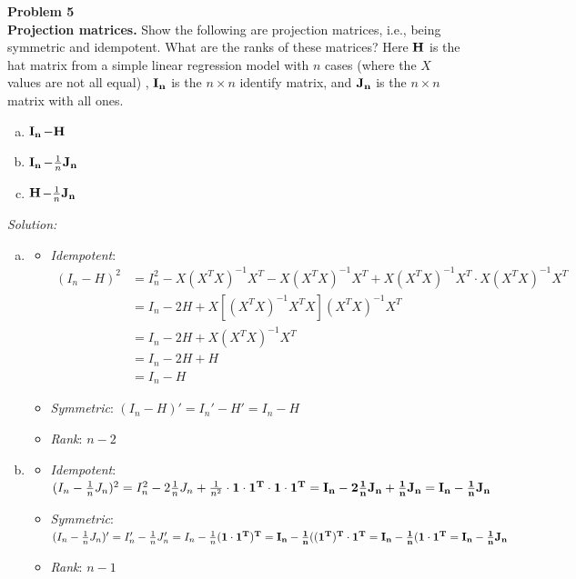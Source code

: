 \documentclass{article}
\newenvironment{problem}[2][Problem]
    { \begin{mdframed}[backgroundcolor=gray!20] \textbf{#1 #2} \\}
    {  \end{mdframed}}
\newenvironment{solution}
    {\textit{Solution:}}
    {}
\begin{document}
\begin{problem}{5}
\textbf{Projection matrices.} Show the following are projection matrices, i.e., being symmetric and idempotent. What are the ranks of these matrices? Here $\bf{H}$ is the hat matrix from a simple linear regression model with $n$ cases (where the $X$ values are not all equal) , $\bf{I_n}$ is the $n \times n$ identify matrix, and $\bf{J_n}$ is the $n \times n$ matrix with all ones.
\begin{enumerate}[(a)]
\item $\bf{I_n}$$ - \bf{H}$
\item $\bf{I_n}$$ - \frac{1}{n} \bf{J_n}$
\item  $\bf{H}$$ - \frac{1}{n} \bf{J_n}$
\end{enumerate}
\end{problem}
\begin{solution}
\begin{enumerate}[(a)]
\item 
\begin{itemize}
\item \emph{Idempotent}: \begin{align*}
(I_n - H)^2 &= I_n^2 - X(X^TX)^{-1}X^T - X(X^TX)^{-1}X^T + X(X^TX)^{-1}X^T \cdot X(X^TX)^{-1}X^T \\
& =  I_n - 2 H + X\left [ (X^TX)^{-1}X^TX \right ](X^TX)^{-1}X^T \\
& =  I_n - 2 H + X(X^TX)^{-1}X^T \\
& =  I_n - 2 H +H \\
&= I_n - H
\end{align*}
\item \emph{Symmetric}: $(I_n - H)' = I_n' - H' = I_n - H$
\item \emph{Rank}: $n - 2$
\end{itemize}
\item 
\begin{itemize}
\item \emph{Idempotent}: $(I_n - \frac{1}{n} J_n)^2 = I_n^2 - 2 \frac{1}{n} J_n   + \frac{1}{n^2} \cdot \bf{1} \cdot \bf{1}^T \cdot \bf{1}\cdot \bf{1}^T =  I_n - 2 \frac{1}{n} J_n   + \frac{1}{n} J_n = I_n - \frac{1}{n} J_n $
\item \emph{Symmetric}: $(I_n - \frac{1}{n} J_n)' = I_n' - \frac{1}{n} J_n' = I_n - \frac{1}{n} (\bf{1}\cdot \bf{1}^T)^T =  I_n - \frac{1}{n} ((\bf{1}^T)^T \cdot \bf{1}^T  = I_n - \frac{1}{n} (\bf{1}\cdot \bf{1}^T = I_n - \frac{1}{n} J_n$
\item \emph{Rank}: $n - 1$ 
\end{itemize} 

\end{enumerate}
\end{solution}
\end{document}
